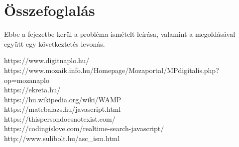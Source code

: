 \documentclass[
]{thesis-ekf}
\begin{document}
\chapter{Összefoglalás}
Ebbe a fejezetbe kerül a probléma ismételt leírása, valamint a megoldásával együtt egy következtetés levonás.
\begin{thebibliography}{}
	https://www.digitnaplo.hu/\\
	https://www.mozaik.info.hu/Homepage/Mozaportal/MPdigitalis.php?op=mozanaplo\\
	https://ekreta.hu/\\
	https://hu.wikipedia.org/wiki/WAMP\\
	https://matebalazs.hu/javascript.html\\
	https://thispersondoesnotexist.com/ \\
	https://codingislove.com/realtime-search-javascript/\\
	http://www.sulibolt.hu/asc\_ism.html
\end{thebibliography}
\end{document}
